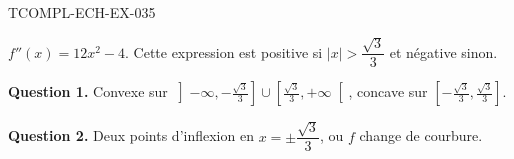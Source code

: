 \begin{corrige}{TCOMPL-ECH-EX-035}

$f''(x) = 12x^2 - 4$. Cette expression est positive si $|x| > \dfrac{\sqrt{3}}{3}$ et négative sinon.


\textbf{Question 1.} Convexe sur $\left]-\infty, -\frac{\sqrt3}{3}\right] \cup \left[\frac{\sqrt3}{3}, +\infty\right[$, concave sur $\left[-\frac{\sqrt3}{3}, \frac{\sqrt3}{3}\right]$.

\textbf{Question 2.} Deux points d'inflexion en $x = \pm\dfrac{\sqrt{3}}{3}$, ou $f$ change de courbure.

\end{corrige}
